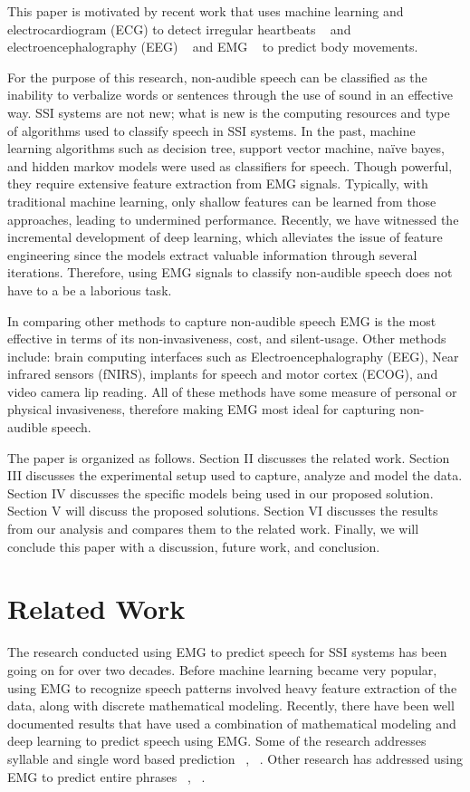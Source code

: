 \documentclass[conference]{IEEEtran}
\begin{document}
This paper is motivated by recent work that uses machine learning and  electrocardiogram (ECG) to detect irregular heartbeats ~\cite{noauthor_classify_nodate} and electroencephalography (EEG) ~\cite{eltvik_deep_nodate} and EMG  ~\cite{altamirano_emg_nodate} to predict body movements. 

For the purpose of this research, non-audible speech can be classified as the inability to verbalize words or sentences through the use of sound in an effective way. SSI systems are not new; what is new is the computing resources and type of algorithms used to classify speech in SSI systems. In the past, machine learning algorithms such as decision tree, support vector machine, naïve bayes, and hidden markov models were used as classifiers for speech. Though powerful, they require extensive feature extraction from EMG signals. Typically, with traditional machine learning, only shallow features can be learned from those approaches, leading to undermined performance. Recently, we have witnessed the incremental development of deep learning, which alleviates the issue of feature engineering since the models extract valuable information through several iterations. Therefore, using EMG signals to classify non-audible speech does not have to a be a laborious task.

In comparing other methods to capture non-audible speech EMG is the most effective in terms of its non-invasiveness, cost, and  silent-usage. Other methods include:  brain computing interfaces such as Electroencephalography (EEG), Near infrared sensors (fNIRS), implants for speech and motor cortex (ECOG), and video camera lip reading. All of these methods have some measure of personal or physical invasiveness, therefore making EMG most ideal for capturing non-audible speech.

The paper is organized as follows. Section II discusses the related work. Section III discusses the experimental setup used to capture, analyze and model the data. Section IV discusses the specific models being used in our proposed solution. Section V will discuss the proposed solutions. Section VI discusses the results from our analysis and compares them to the related work. Finally, we will conclude this paper with a discussion, future work, and conclusion.

\section{Related Work}
The research conducted using EMG to predict speech for SSI systems has been going on for over two decades. Before machine learning became very popular, using EMG to recognize speech patterns involved heavy feature extraction of the data, along with discrete mathematical modeling. Recently, there have been well documented results that have used a combination of mathematical modeling and deep learning to predict speech using EMG. Some of the research addresses syllable and single word based prediction ~\cite{lopez-larraz_syllable-based_2010}, ~\cite{maier-hein_session_2005}. Other research has addressed using EMG to predict entire phrases ~\cite{janke_emg--speech:_2017}, ~\cite{kapur_alterego:_2018}.
\end{document}
